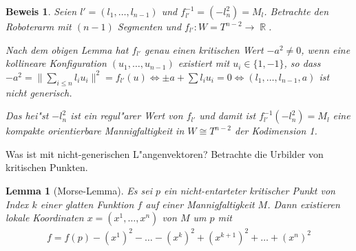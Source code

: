 \documentclass[paper=A4, twoside, chapterprefix=true, bibliography=totoc, headsepline]{scrbook}
\newcommand{\tikzgitter}[3][0.25]{ %
	\draw[step=#1,gray!15] #2 grid #3;
	\draw[step=2*#1,gray!30] #2 grid #3;
	\fill (0,0) circle(0.1); 
}
\DeclareMathOperator{\R}{\mathbb{R}}
\theoremstyle{break}
\theoremstyle{nonumberbreak}
\newtheorem{lemma}{Lemma}
\newtheorem{bew}{Beweis}
\theoremstyle{emptybreak}
\theoremstyle{break}
\newcommand{\quot}[1]{\textrm{\glqq}{#1}\textrm{\grqq}}
\begin{document}
\begin{bew}
Seien $l' = (l_1, \ldots, l_{n-1})$ und $f_{l'}^{-1} = (-l_n^2) = M_l$.
Betrachte den \quot{Roboterarm} mit $(n-1)$ Segmenten und $f_{l'}: W = T^{n-2} \to \R$.
\begin{center}\end{center}
Nach dem obigen Lemma hat $f_{l'}$ genau einen kritischen Wert $-a^2 \ne 0$, wenn eine kollineare Konfiguration $(u_1, \ldots, u_{n-1})$ existiert mit $u_i \in \{1, -1\}$, so dass $-a^2 = \| \sum _{i \le n} l_i u_i \|^2 = f_{l'}(u) \Leftrightarrow \pm a + \sum l_i u_i = 0 \Leftrightarrow (l_1, \ldots, l_{n-1}, a)$ ist nicht generisch.

Das hei"st $-l_n^2$ ist ein regul"arer Wert von $f_{l'}$ und damit ist $f_{l'}^{-1} (-l_n^2) = M_l$ eine kompakte orientierbare Mannigfaltigkeit in $W \cong T^{n-2}$ der Kodimension 1.
\end{bew}


Was ist mit nicht-generischen L"angenvektoren?
Betrachte die Urbilder von kritischen Punkten.

\begin{lemma}[Morse-Lemma]
Es sei $p$ ein nicht-entarteter kritischer Punkt von Index $k$ einer glatten Funktion $f$ auf einer Mannigfaltigkeit $M$.
Dann existieren lokale Koordinaten $x = (x^1, \ldots, x^n)$ von $M$ um $p$ mit
\begin{align*}
	f = f(p) - (x^1)^2 - \ldots - (x^k)^2 + (x^{k+1})^2 + \ldots + (x^n)^2
\end{align*}
\end{lemma}
\end{document}
